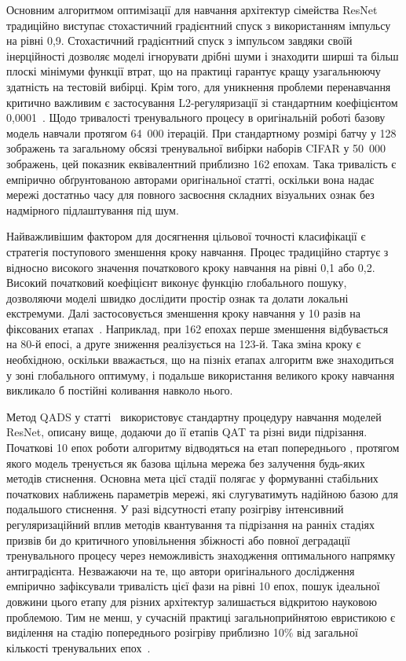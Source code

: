 \documentclass{pma-mthesis}
\begin{document}
Основним алгоритмом оптимізації для навчання архітектур сімейства ResNet традиційно виступає стохастичний градієнтний спуск з використанням імпульсу на рівні 0,9. Стохастичний градієнтний спуск з імпульсом завдяки своїй інерційності дозволяє моделі ігнорувати дрібні шуми і знаходити ширші та більш плоскі мінімуми функції втрат, що на практиці гарантує кращу узагальнюючу здатність на тестовій вибірці. Крім того, для уникнення проблеми перенавчання критично важливим є застосування L2-регуляризації зі стандартним коефіцієнтом 0,0001~\cite{he2016deep}. Щодо тривалості тренувального процесу в оригінальній роботі базову модель навчали протягом 64~000 ітерацій. При стандартному розмірі батчу у 128 зображень та загальному обсязі тренувальної вибірки наборів CIFAR у 50~000 зображень, цей показник еквівалентний приблизно 162 епохам. Така тривалість є емпірично обґрунтованою авторами оригінальної статті, оскільки вона надає мережі достатньо часу для повного засвоєння складних візуальних ознак без надмірного підлаштування під шум. 

Найважливішим фактором для досягнення цільової точності класифікації є стратегія поступового зменшення кроку навчання. Процес традиційно стартує з відносно високого значення початкового кроку навчання на рівні 0,1 або 0,2. Високий початковий коефіцієнт виконує функцію глобального пошуку, дозволяючи моделі швидко дослідити простір ознак та долати локальні екстремуми. Далі застосовується зменшення кроку навчання у 10 разів на фіксованих етапах~\cite{he2016deep}. Наприклад, при 162 епохах перше зменшення відбувається на 80-й епосі, а друге зниження реалізується на 123-й. Така зміна кроку є необхідною, оскільки вважається, що на пізніх етапах алгоритм вже знаходиться у зоні глобального оптимуму, і подальше використання великого кроку навчання викликало б постійні коливання навколо нього.

Метод QADS у статті~\cite{10946020} використовує стандартну процедуру навчання моделей ResNet, описану вище, додаючи до її етапів QAT та різні види підрізання. Початкові 10 епох роботи алгоритму відводяться на етап попереднього , протягом якого модель тренується як базова щільна мережа без залучення будь-яких методів стиснення. Основна мета цієї стадії полягає у формуванні стабільних початкових наближень параметрів мережі, які слугуватимуть надійною базою для подальшого стиснення. У разі відсутності етапу розігріву інтенсивний регуляризаційний вплив методів квантування та підрізання на ранніх стадіях призвів би до критичного уповільнення збіжності або повної деградації тренувального процесу через неможливість знаходження оптимального напрямку антиградієнта. Незважаючи на те, що автори оригінального дослідження емпірично зафіксували тривалість цієї фази на рівні 10 епох, пошук ідеальної довжини цього етапу для різних архітектур залишається відкритою науковою проблемою. Тим не менш, у сучасній практиці загальноприйнятою евристикою є виділення на стадію попереднього розігріву приблизно 10\% від загальної кількості тренувальних епох~\cite{liu2025paretoq}.
\end{document}
